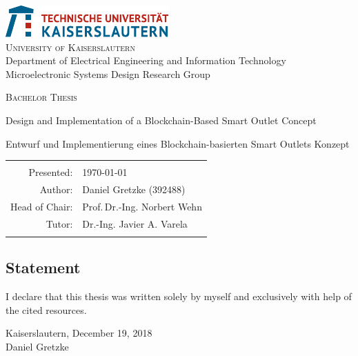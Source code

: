 \begin{titlepage}
\setcounter{page}{-1}
\begin{center}
\includegraphics*[scale=2.5]{img/TUKL_LOGO.pdf}\\[3ex]

\textsc{\Large University of Kaiserslautern}\\[1.5ex]
Department of Electrical Engineering and Information Technology\\[1.5ex]
Microelectronic Systems Design Research Group \\[3ex]

\vfill
\vfill

\textsc{\Huge Bachelor Thesis}\\[6ex]
\centerline{\Large Design and Implementation of a Blockchain-Based Smart Outlet Concept}
\vspace{20pt}
\centerline{\Large Entwurf und Implementierung eines Blockchain-basierten Smart Outlets Konzept}

\vfill
\vfill

 \begin{tabular}{rl}\hline\\
 Presented:                & \quad \today \\[1.5ex]
 Author:                   & \quad Daniel Gretzke (392488) \\[1.5ex]
 Head of Chair:            & \quad Prof.\,Dr.-Ing. Norbert Wehn\\[1.5ex]
 Tutor:                    & \quad Dr.-Ing. Javier A. Varela\\[1.5ex]\\\hline
 \end{tabular}
\end{center}

    \clearpage
    \pagestyle{empty}
    \begin{flushleft}
    \section*{Statement}
    \vspace{10mm}
    I declare that this thesis was written solely by myself and exclusively with
    help of the cited resources.

    \vspace{12pt}
    Kaiserslautern, December 19, 2018 \\
    \vspace{20mm}
    Daniel Gretzke
    \end{flushleft}

\end{titlepage}

